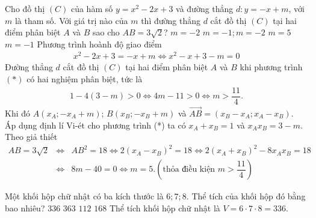 \begin{ex}%
 Cho đồ thị $(C)$ của hàm số $y = x^2 - 2x + 3$ và đường thẳng  $d\colon y = -x + m$, với $m$ là tham số. Với giá trị nào của $m$ thì đường thẳng $d$ cắt đồ thị $(C)$ tại hai điểm phân biệt $A$ và $B$ sao cho $AB = 3 \sqrt{2}$?
 \choice
  {$m = -2$}
  {$m = -1; m = -2$}
  {\True $m = 5$}
  {$m = -1$}
 \loigiai
  {
  Phương trình hoành độ giao điểm
  \begin{align*}
   x^2 - 2x + 3 = -x + m \Leftrightarrow x^2 - x + 3 - m = 0 \tag{$*$}
  \end{align*}
  Đường thẳng $d$ cắt đồ thị $(C)$ tại hai điểm phân biệt $A$ và $B$ khi phương trình $(*)$ có hai nghiệm phân biệt, tức là
  \begin{eqnarray*}
   1 - 4 (3-m) > 0 \Leftrightarrow 4m - 11 > 0 \Leftrightarrow m > \dfrac{11}{4}.
  \end{eqnarray*}
  Khi đó $A \left( x_A; -x_A + m \right)$; $B \left( x_B; -x_B + m \right)$ và $\overrightarrow{AB} = \left(x_B - x_A ; x_A - x_B \right)$.\\
  Áp dụng định lí Vi-ét cho phương trình (*) ta có $x_A + x_B = 1$ và $x_A x_B = 3-m$.\\
  Theo giả thiết
  \begin{eqnarray*}
   AB = 3\sqrt{2} &\Leftrightarrow & AB^2 = 18 \Leftrightarrow 2\left(x_A - x_B\right)^2 = 18   \Leftrightarrow  2(x_A + x_B)^2 - 8x_A x_B = 18\\
   &\Leftrightarrow & 8m - 40 = 0 \Leftrightarrow m = 5. \left(\text{thỏa điều kiện } m > \dfrac{11}{4} \right)
  \end{eqnarray*}
  }
\end{ex}

\begin{ex}%
 Một khối hộp chữ nhật có ba kích thước là $6; 7 ; 8$. Thể tích của khối hộp đó bằng bao nhiêu?
 \choice
  {\True $336$}
  {$363$}
  {$112$}
  {$168$}
 \loigiai
  {
  Thể tích khối hộp chữ nhật là $V = 6 \cdot 7 \cdot 8 = 336$.
  }
\end{ex}


